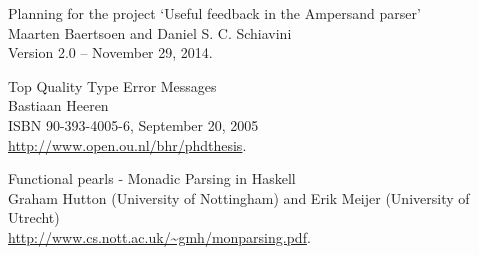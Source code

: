 \label{sec:bibliography}

\begin{thebibliography}{99}

	Planning for the project `Useful feedback in the Ampersand parser'\\
	Maarten Baertsoen and Daniel S. C. Schiavini\\
	Version 2.0 -- November 29, 2014.

	Top Quality Type Error Messages\\
	Bastiaan Heeren\\
	ISBN 90-393-4005-6, September 20, 2005\\
	\url{http://www.open.ou.nl/bhr/phdthesis}.

	Functional pearls - Monadic Parsing in Haskell\\
	Graham Hutton (University of Nottingham) and Erik Meijer (University of Utrecht)\\
	\url{http://www.cs.nott.ac.uk/~gmh/monparsing.pdf}.

\end{thebibliography}